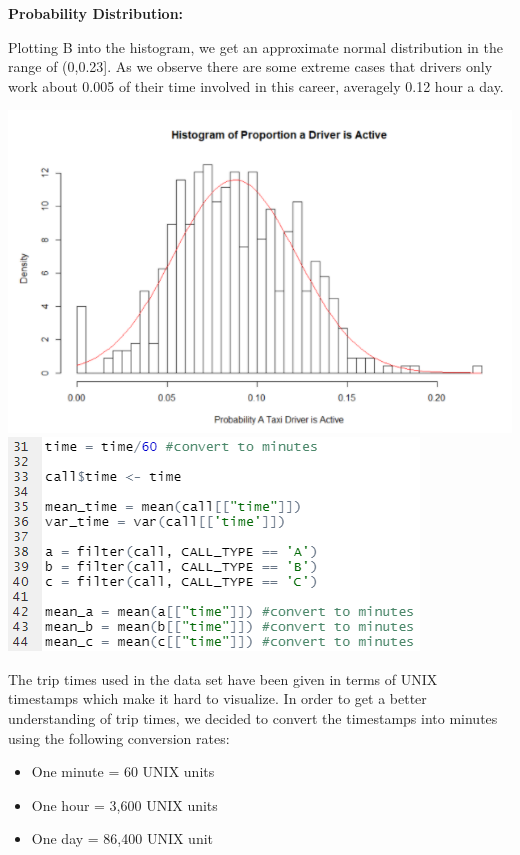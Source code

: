\documentclass[11pt]{article}
\begin{document}
\textbf{Probability Distribution:}
\par
Plotting B into the histogram, we get an approximate normal distribution in the range of (0,0.23]. As we observe there are some extreme cases that drivers only work about 0.005 of their time involved in this career, averagely 0.12 hour a day.

\noindent\includegraphics{Hist(PropActDriv).png}\\

\centering\noindent\includegraphics{Part3(Code).png}\\

\flushleft\par
The trip times used in the data set have been given in terms of UNIX timestamps which make it hard to visualize. In order to get a better understanding of trip times, we decided to convert the timestamps into minutes using the following conversion rates:

\begin{itemize}
	\item One minute = 60 UNIX units
	\item One hour = 3,600 UNIX units
	\item One day = 86,400 UNIX unit
\end{itemize}
\end{document}
